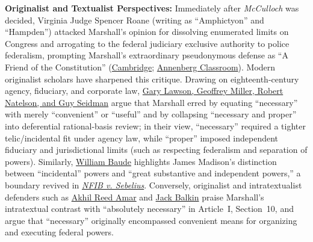 \documentclass[12pt]{article}
\begin{document}
\textbf{Originalist and Textualist Perspectives:} Immediately after \textit{McCulloch} was decided, Virginia Judge Spencer Roane (writing as ``Amphictyon'' and ``Hampden'') attacked Marshall's opinion for dissolving enumerated limits on Congress and arrogating to the federal judiciary exclusive authority to police federalism, prompting Marshall's extraordinary pseudonymous defense as ``A Friend of the Constitution'' (\href{https://www.cambridge.org/core/books/monitoring-american-federalism/state-challenges-to-the-supreme-courts-control-over-constitutional-interpretation/85539C2F1811467C31EF62DBD350C7D8}{Cambridge}; \href{https://www.annenbergclassroom.org/resource/the-pursuit-of-justice/pursuit-justice-chapter-2-national-bank-federalism/}{Annenberg Classroom}). Modern originalist scholars have sharpened this critique. Drawing on eighteenth-century agency, fiduciary, and corporate law, \href{https://scholarship.law.bu.edu/cgi/viewcontent.cgi?filename=0&article=4259&context=faculty_scholarship&type=additional}{Gary Lawson, Geoffrey Miller, Robert Natelson, and Guy Seidman} argue that Marshall erred by equating ``necessary'' with merely ``convenient'' or ``useful'' and by collapsing ``necessary and proper'' into deferential rational-basis review; in their view, ``necessary'' required a tighter telic/incidental fit under agency law, while ``proper'' imposed independent fiduciary and jurisdictional limits (such as respecting federalism and separation of powers). Similarly, \href{https://harvardlawreview.org/forum/vol-128/sharing-the-necessary-and-proper-clause/}{William Baude} highlights James Madison's distinction between ``incidental'' powers and ``great substantive and independent powers,'' a boundary revived in \textit{\href{https://supreme.justia.com/cases/federal/us/567/11-393/case.pdf}{NFIB v. Sebelius}}. Conversely, originalist and intratextualist defenders such as \href{https://akhilamar.com/wp-content/uploads/2022/04/Intratextualism.pdf}{Akhil Reed Amar} and \href{https://constitutioncenter.org/the-constitution/articles/article-i/clauses/754}{Jack Balkin} praise Marshall's intratextual contrast with ``absolutely necessary'' in Article~I, Section~10, and argue that ``necessary'' originally encompassed convenient means for organizing and executing federal powers.
\end{document}
